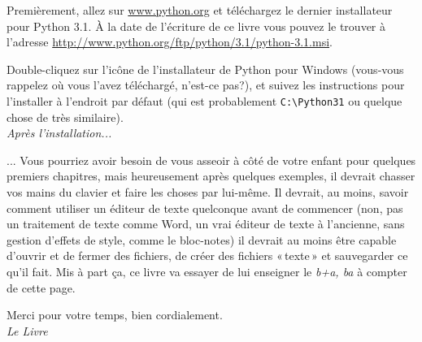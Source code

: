 Premièrement, allez sur \url{www.python.org} et téléchargez le dernier installateur pour Python 3.1. À la date de l'écriture de ce livre vous pouvez le trouver à l'adresse  \url{http://www.python.org/ftp/python/3.1/python-3.1.msi}.

Double-cliquez sur l'icône de l'installateur de Python pour Windows (vous-vous rappelez où vous l'avez téléchargé, n'est-ce pas?), et suivez les instructions pour l'installer à l'endroit par défaut (qui est probablement \verb+C:\Python31+ ou quelque chose de très similaire).\\


\textit{Après l'installation...}


... Vous pourriez avoir besoin de vous asseoir à côté de votre enfant pour quelques premiers chapitres, mais 
heureusement après quelques exemples, il devrait chasser vos mains du clavier et faire les choses par lui-même. 
Il devrait, au moins, savoir comment utiliser un éditeur de texte quelconque avant de commencer (non, pas un traitement de texte comme Word, un vrai éditeur de texte à l'ancienne, sans gestion d'effets de style, comme le bloc-notes) il devrait au moins être capable d'ouvrir et de fermer des fichiers, de créer des fichiers « texte » et sauvegarder ce qu'il fait. Mis à part ça, ce livre va essayer de lui enseigner le \textit{b+a, ba} à compter de cette page.

\bigskip
Merci pour votre temps, bien cordialement.\\


\textit{Le Livre}
